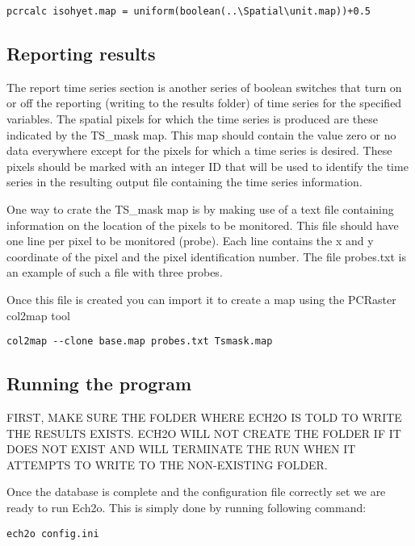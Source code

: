 \begin{verbatim}
pcrcalc isohyet.map = uniform(boolean(..\Spatial\unit.map))+0.5
\end{verbatim} 


\subsection{Reporting results}
 
The report time series section is another series of boolean switches that turn on or off the reporting (writing to the results folder) of time series for the specified variables. The spatial pixels for which the time series is produced are these indicated by the \textsf{TS\_mask} map. This map should contain the value zero or no data everywhere except for the pixels for which a time series is desired. These pixels should be marked with an integer ID that will be used to identify the time series in the resulting output file containing the time series information.   

One way to crate the \textsf{TS\_mask} map is by making use of a text file containing information on the location of the pixels to be monitored. This file should have one line per pixel to be monitored (probe). Each line contains the x and y coordinate of the pixel and the pixel identification number. The file \textsf{probes.txt} is an example of such a file with three probes. 

Once this file is created you can import it to create a map using the PCRaster \textsf{col2map} tool 

\begin{verbatim}
col2map --clone base.map probes.txt Tsmask.map
\end{verbatim} 
 

 
 
\subsection{Running the program}

FIRST, MAKE SURE THE FOLDER WHERE ECH2O IS TOLD TO WRITE THE RESULTS EXISTS. ECH2O WILL NOT CREATE THE FOLDER IF IT DOES NOT EXIST AND WILL TERMINATE THE RUN WHEN IT ATTEMPTS TO WRITE TO THE NON-EXISTING FOLDER.

Once the database is complete and the configuration file correctly set we are ready to run Ech2o. This is simply done by running following command: 

\begin{verbatim}
ech2o config.ini
\end{verbatim} 


